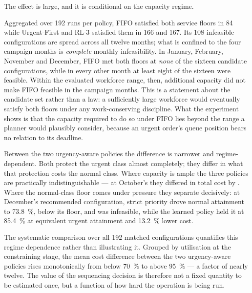 The effect is large, and it is conditional on the capacity regime.

Aggregated over 192 runs per policy, FIFO satisfied both service floors in \num{84} while
Urgent-First and RL-3 satisfied them in \num{166} and \num{167}. Its \num{108} infeasible
configurations are spread across all twelve months; what is confined to the four campaign months
is \emph{complete} monthly infeasibility. In January, February, November and
December, FIFO met both floors at \emph{none} of the sixteen candidate configurations, while in
every other month at least eight of the sixteen were feasible. Within the evaluated workforce
range, then, additional capacity did not make FIFO feasible in the campaign months. This is a
statement about the candidate set rather than a law: a sufficiently large workforce would
eventually satisfy both floors under any work-conserving discipline. What the experiment shows
is that the capacity required to do so under FIFO lies beyond the range a planner would
plausibly consider, because an urgent order's queue position bears no relation to its
deadline.

Between the two urgency-aware policies the difference is narrower and regime-dependent. Both
protect the urgent class almost completely; they differ in what that protection costs the
normal class. Where capacity is ample the three policies are practically indistinguishable ---
at October's  they differed in total cost by . Where the normal-class
floor comes under pressure they separate decisively: at December's recommended configuration,
strict priority drove normal attainment to \SI{73.8}{\percent}, below its floor, and was
infeasible, while the learned policy held it at \SI{85.4}{\percent} at equivalent urgent
attainment and \SI{13.2}{\percent} lower cost.

The systematic comparison over all 192 matched configurations quantifies this regime
dependence rather than illustrating it. Grouped by utilisation at the constraining stage, the
mean cost difference between the two urgency-aware policies rises monotonically from
 below \SI{70}{\percent} to  above \SI{95}{\percent} --- a factor of nearly
twelve. The value of the sequencing decision is therefore not a fixed quantity to be estimated
once, but a function of how hard the operation is being run.

